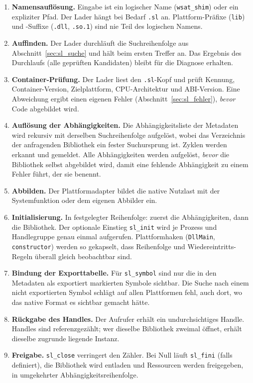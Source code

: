 \begin{enumerate}
	\item \textbf{Namensauflösung.} Eingabe ist ein logischer Name (\texttt{wsat\_shim}) oder ein expliziter Pfad. Der Lader hängt bei Bedarf \texttt{.sl} an. Plattform-Präfixe (\texttt{lib}) und -Suffixe (\texttt{.dll}, \texttt{.so.1}) sind nie Teil des logischen Namens.
	\item \textbf{Auffinden.} Der Lader durchläuft die Suchreihenfolge aus Abschnitt~\ref{sec:sl_suche} und hält beim ersten Treffer an. Das Ergebnis des Durchlaufs (alle geprüften Kandidaten) bleibt für die Diagnose erhalten.
	\item \textbf{Container-Prüfung.} Der Lader liest den \texttt{.sl}-Kopf und prüft Kennung, Container-Version, Zielplattform, CPU-Architektur und ABI-Version. Eine Abweichung ergibt einen eigenen Fehler (Abschnitt~\ref{sec:sl_fehler}), \emph{bevor} Code abgebildet wird.
	\item \textbf{Auflösung der Abhängigkeiten.} Die Abhängigkeitsliste der Metadaten wird rekursiv mit derselben Suchreihenfolge aufgelöst, wobei das Verzeichnis der anfragenden Bibliothek ein fester Suchursprung ist. Zyklen werden erkannt und gemeldet. Alle Abhängigkeiten werden aufgelöst, \emph{bevor} die Bibliothek selbst abgebildet wird, damit eine fehlende Abhängigkeit zu einem Fehler führt, der sie benennt.
	\item \textbf{Abbilden.} Der Plattformadapter bildet die native Nutzlast mit der Systemfunktion oder dem eigenen Abbilder ein.
	\item \textbf{Initialisierung.} In festgelegter Reihenfolge: zuerst die Abhängigkeiten, dann die Bibliothek. Der optionale Einstieg \texttt{sl\_init} wird je Prozess und Handlegruppe genau einmal aufgerufen. Plattformhaken (\texttt{DllMain}, \texttt{constructor}) werden so gekapselt, dass Reihenfolge und Wiedereintritts-Regeln überall gleich beobachtbar sind.
	\item \textbf{Bindung der Exporttabelle.} Für \texttt{sl\_symbol} sind nur die in den Metadaten als exportiert markierten Symbole sichtbar. Die Suche nach einem nicht exportierten Symbol schlägt auf allen Plattformen fehl, auch dort, wo das native Format es sichtbar gemacht hätte.
	\item \textbf{Rückgabe des Handles.} Der Aufrufer erhält ein undurchsichtiges Handle. Handles sind referenzgezählt; wer dieselbe Bibliothek zweimal öffnet, erhält dieselbe zugrunde liegende Instanz.
	\item \textbf{Freigabe.} \texttt{sl\_close} verringert den Zähler. Bei Null läuft \texttt{sl\_fini} (falls definiert), die Bibliothek wird entladen und Ressourcen werden freigegeben, in umgekehrter Abhängigkeitsreihenfolge.
\end{enumerate}

